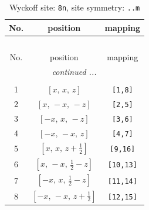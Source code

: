 \documentclass[fleqn,8pt]{jsarticle}
\begin{document}
\begin{longtable}{ccc}
\caption{Wyckoff site: {\tt 8n}, site symmetry: {\tt ..m}}
 \\
 \hline \hline
No. & position & mapping \\ \hline \endfirsthead

\multicolumn{2}{l}{\tablename\ \thetable{}} \\
 \hline \hline
No. & position & mapping \\ \hline \endhead

 \hline \hline
\multicolumn{2}{r}{\footnotesize\it continued ...} \\ \endfoot

 \hline \hline
\multicolumn{2}{r}{} \\ \endlastfoot

1 & $\left[ x,\, x,\, z \right]$ & {\tt [1,8]} \\ \hline
2 & $\left[ x,\, - x,\, - z \right]$ & {\tt [2,5]} \\ \hline
3 & $\left[ - x,\, x,\, - z \right]$ & {\tt [3,6]} \\ \hline
4 & $\left[ - x,\, - x,\, z \right]$ & {\tt [4,7]} \\ \hline
5 & $\left[ x,\, x,\, z + \frac{1}{2} \right]$ & {\tt [9,16]} \\ \hline
6 & $\left[ x,\, - x,\, \frac{1}{2} - z \right]$ & {\tt [10,13]} \\ \hline
7 & $\left[ - x,\, x,\, \frac{1}{2} - z \right]$ & {\tt [11,14]} \\ \hline
8 & $\left[ - x,\, - x,\, z + \frac{1}{2} \right]$ & {\tt [12,15]} \\
\end{longtable}
\renewcommand{\arraystretch}{1.2}
\end{document}
